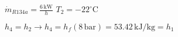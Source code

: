 \( \dot{m}_{R134a} = \frac{6 \, \text{kW}}{h} \)  
\( T_2 = -22^\circ \text{C} \)  

\( h_4 = h_2 \rightarrow h_4 = h_{f} (8 \, \text{bar}) = 53.42 \, \text{kJ/kg} = h_1 \)